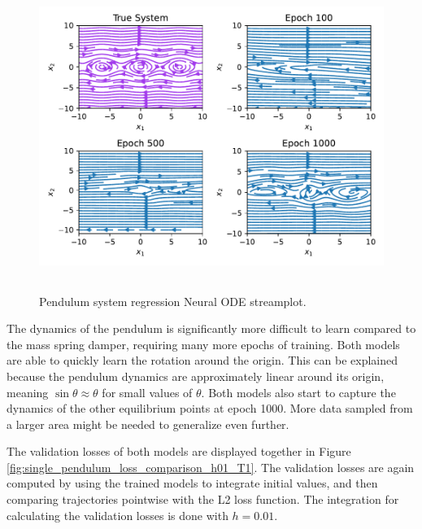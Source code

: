 \documentclass[12pt,a4paper]{book}
\begin{document}
\begin{figure}[H]
    \centering
    \includegraphics[height=10cm]{figs/plots/basic_experiments/single_pendulum_node_streamplot.pdf}
    \caption{Pendulum system regression Neural ODE streamplot.}
    \label{fig:single_pendulum_node_streamplot}
\end{figure}

The dynamics of the pendulum is significantly more difficult to learn compared to the mass spring damper, requiring many more epochs of training. Both models are able to quickly learn the rotation around the origin. This can be explained because the pendulum dynamics are approximately linear around its origin, meaning $\sin{\theta} \approx \theta$ for small values of $\theta$. Both models also start to capture the dynamics of the other equilibrium points at epoch 1000. More data sampled from a larger area might be needed to generalize even further.

The validation losses of both models are displayed together in Figure \ref{fig:single_pendulum_loss_comparison_h01_T1}. The validation losses are again computed by using the trained models to integrate initial values, and then comparing trajectories pointwise with the L2 loss function. The integration for calculating the validation losses is done with $h = 0.01$.
\end{document}
